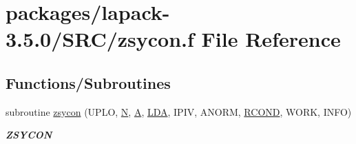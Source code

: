 \hypertarget{zsycon_8f}{}\section{packages/lapack-\/3.5.0/\+S\+R\+C/zsycon.f File Reference}
\label{zsycon_8f}
\subsection*{Functions/\+Subroutines}
\begin{DoxyCompactItemize}
\item 
subroutine \hyperlink{group__complex16SYcomputational_ga3f603755cb45f43f6e494266149e8adc}{zsycon} (U\+P\+L\+O, \hyperlink{polmisc_8c_a0240ac851181b84ac374872dc5434ee4}{N}, \hyperlink{classA}{A}, \hyperlink{example__user_8c_ae946da542ce0db94dced19b2ecefd1aa}{L\+D\+A}, I\+P\+I\+V, A\+N\+O\+R\+M, \hyperlink{superlu__enum__consts_8h_af00a42ecad444bbda75cde1b64bd7e72a9b5c151728d8512307565994c89919d5}{R\+C\+O\+N\+D}, W\+O\+R\+K, I\+N\+F\+O)
\begin{DoxyCompactList}\small\item\em {\bfseries Z\+S\+Y\+C\+O\+N} \end{DoxyCompactList}\end{DoxyCompactItemize}
